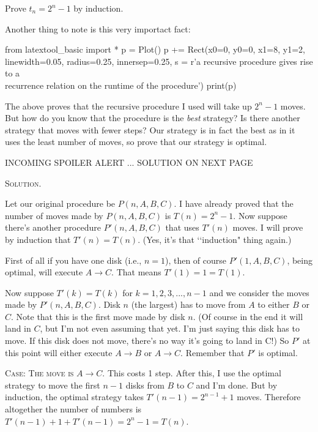 \newpage
\begin{ex}
  Prove $t_n = 2^n - 1$ by induction.
\end{ex}


\newpage
Another thing to note is this very importact fact:
\begin{python}
from latextool_basic import *
p = Plot()
p += Rect(x0=0, y0=0, x1=8, y1=2,
linewidth=0.05,
     radius=0.25, innersep=0.25,
    s = r'a recursive procedure gives rise to a \\ recurrence relation on the runtime of the procedure')
print(p)
\end{python}

\newpage
\begin{ex}
  The above proves that the recursive procedure I used
  will take up $2^n - 1$ moves.
  But how do you know that the procedure is the \textit{best}
  strategy?
  Is there another strategy that moves with fewer steps?
  Our strategy is in fact the best as in it uses the least
  number of moves, so prove that our strategy is optimal.
\end{ex}

INCOMING SPOILER ALERT ... SOLUTION ON NEXT PAGE

\newpage
\textsc{Solution.}

Let our original procedure be $P(n, A, B, C)$. I have already proved
that the number of moves made by $P(n, A, B, C)$ is $T(n) = 2^n - 1$.
Now suppose there's another procedure $P'(n, A, B, C)$ that uses
$T'(n)$ moves. I will prove by induction that $T'(n) = T(n)$.
(Yes, it's that \lq\lq induction" thing again.)

First of all if you have one disk (i.e., $n = 1$), then of course
$P'(1, A, B, C)$, being optimal, will execute $A \rightarrow C$.
That means $T'(1) = 1 = T(1)$.

Now suppose $T'(k) = T(k)$ for $k = 1, 2, 3, ..., n - 1$
and we consider the moves made by $P'(n, A, B, C)$.
Disk $n$ (the largest) has to move from $A$ to either $B$ or $C$.
Note that this is the first move made by disk $n$.
(Of course in the end it will land in $C$, but I'm not even assuming that yet.
I'm just saying this disk has to move.
If this disk does not move, there's no way it's going to land in C!)
So $P'$ at this point will either execute $A \rightarrow B$
or $A \rightarrow C$.
Remember that $P'$ is optimal.

\textsc{Case: The move is $A\rightarrow C$.}
This costs 1 step.
After this, I use the optimal strategy to move the first $n - 1$ disks
from $B$ to $C$ and I'm done.
But by induction, the optimal strategy takes
$T'(n-1) = 2^{n - 1} + 1$ moves.
Therefore altogether the number of numbers is
$T'(n - 1) + 1 + T'(n-1) = 2^n - 1 = T(n)$.

